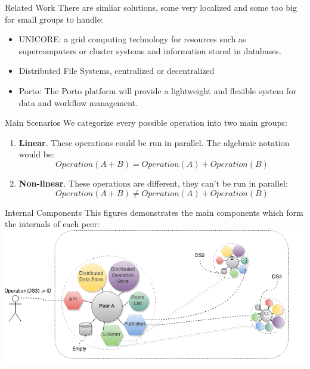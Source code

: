 \documentclass[final,hyperref={pdfpagelabels=true}]{beamer}
\begin{document}
\begin{frame}
\begin{columns}[t]
\begin{column}{.45\textwidth}
      \begin{block}{Related Work}
        There are simliar solutions, some very localized and some too big for small groups to handle:
        \begin{itemize}
        \item UNICORE: a grid computing technology for resources such as supercomputers or cluster systems and information stored in databases.\cite{unicore}
        \item Distributed File Systems, centralized or decentralized
        \item Porto: The Porto platform will provide a lightweight and flexible system for data and workflow management.\cite{porto}
        \end{itemize}
      \end{block}


      \begin{block}{Main Scenarios}
      We categorize every possible operation into two main groups:
      \begin{enumerate}
      \item \textbf{Linear}. These operations could be run in parallel. The algebraic notation would be:
      \[ Operation(A + B) = Operation(A) + Operation(B) \]
      \item \textbf{Non-linear}. These operations are different, they can't be run in parallel:
      \[ Operation(A + B) \neq Operation(A) + Operation(B) \]
      \end{enumerate}
      \end{block}

      \begin{block}{Internal Components}
      This figures demonstrates the main components which form the internals of each peer:\\
      
      \includegraphics[width=\textwidth]{sys2}
      \end{block}
      

\end{column}
\end{columns}
\end{frame}
\end{document}
